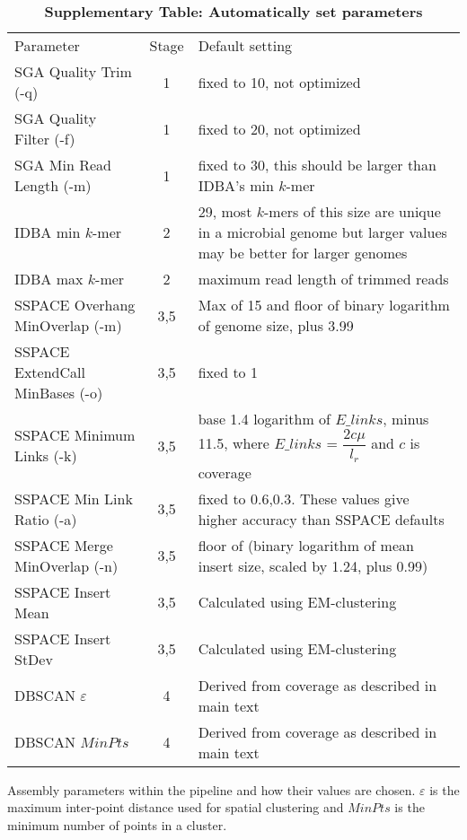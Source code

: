 \documentclass[10pt]{article}
\begin{document}
\begin{table}[hp]
\caption{\bf{Supplementary Table: Automatically set parameters}}
\footnotesize
{\begin{tabular}{l|c|l}
Parameter                       & Stage & Default setting  \\
SGA Quality Trim (-q)           & 1     & fixed to 10, not optimized \\
SGA Quality Filter (-f)         & 1     & fixed to 20, not optimized \\
SGA Min Read Length (-m)        & 1     & fixed to 30, this should be larger than IDBA's min $k$-mer \\
IDBA min $k$-mer                & 2     & 29, most $k$-mers of this size are unique in a microbial genome but larger values may be better for larger genomes \\
IDBA max $k$-mer                & 2     & maximum read length of trimmed reads \\
SSPACE Overhang MinOverlap (-m) & 3,5   & Max of 15 and floor of binary logarithm of genome size, plus 3.99  \\
SSPACE ExtendCall MinBases (-o) & 3,5   & fixed to 1 \\
SSPACE Minimum Links (-k)       & 3,5   & base 1.4 logarithm of $E\_links$, minus 11.5, where $E\_links$ = $\dfrac{2c\mu}{l_r}$ and $c$ is coverage \\
SSPACE Min Link Ratio (-a)      & 3,5   & fixed to 0.6,0.3. These values give higher accuracy than SSPACE defaults  \\
SSPACE Merge MinOverlap (-n)    & 3,5   & floor of (binary logarithm of mean insert size, scaled by 1.24, plus 0.99) \\
SSPACE Insert Mean 	        & 3,5   & Calculated using EM-clustering \\
SSPACE Insert StDev             & 3,5   & Calculated using EM-clustering \\
DBSCAN $\varepsilon$            & 4     & Derived from coverage as described in main text \\
DBSCAN $MinPts$                 & 4     & Derived from coverage as described in main text \\
\end{tabular}}
\begin{flushleft} Assembly parameters within the pipeline and how their values are chosen. $\varepsilon$ is the maximum inter-point distance 
used for spatial clustering and $MinPts$ is the minimum number of points in a cluster.
\end{flushleft}
\label{tab:tab03}
\end{table}
\end{document}
